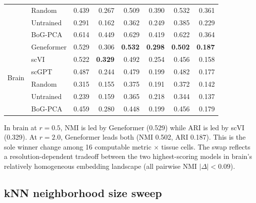 \documentclass[10pt,letterpaper]{article}
\begin{document}
\begin{table}[h!]
\begin{tabular}{@{}ll rr rr rr@{}}
 & Random     & 0.439 & 0.267 & 0.509 & 0.390 & 0.532 & 0.361 \\
 & Untrained  & 0.291 & 0.162 & 0.362 & 0.249 & 0.385 & 0.229 \\
 & BoG-PCA    & 0.614 & 0.449 & 0.629 & 0.419 & 0.622 & 0.364 \\
\midrule
\multirow{6}{*}{Brain}
 & Geneformer & 0.529 & 0.306 & \textbf{0.532} & \textbf{0.298} & \textbf{0.502} & \textbf{0.187} \\
 & scVI       & 0.522 & \textbf{0.329} & 0.492 & 0.254 & 0.456 & 0.158 \\
 & scGPT      & 0.487 & 0.244 & 0.479 & 0.199 & 0.482 & 0.177 \\
 & Random     & 0.315 & 0.155 & 0.375 & 0.191 & 0.372 & 0.142 \\
 & Untrained  & 0.239 & 0.159 & 0.365 & 0.218 & 0.344 & 0.137 \\
 & BoG-PCA    & 0.459 & 0.280 & 0.448 & 0.199 & 0.456 & 0.179 \\
\bottomrule
\end{tabular}
\end{table}

In brain at $r = 0.5$, NMI is led by Geneformer (0.529) while ARI is led by scVI (0.329). At $r = 2.0$, Geneformer leads both (NMI 0.502, ARI 0.187). This is the sole winner change among 16 computable metric $\times$ tissue cells. The swap reflects a resolution-dependent tradeoff between the two highest-scoring models in brain's relatively homogeneous embedding landscape (all pairwise NMI $|\Delta| < 0.09$).

\subsection{kNN neighborhood size sweep}
\end{document}
